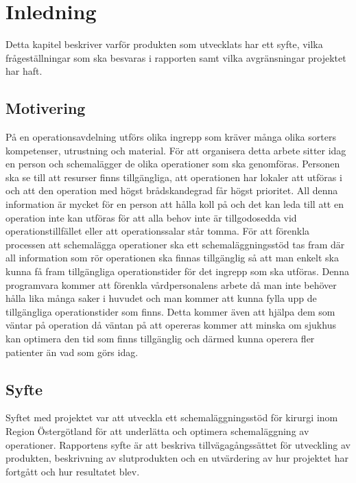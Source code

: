 \chapter{Inledning}
Detta kapitel beskriver varför produkten som utvecklats har ett syfte, vilka frågeställningar som ska besvaras i rapporten samt vilka avgränsningar projektet har haft.

\section{Motivering}
På en operationsavdelning utförs olika ingrepp som kräver många olika sorters kompetenser, utrustning och material. För att organisera detta arbete sitter idag en person och schemalägger de olika operationer som ska genomföras. Personen ska se till att resurser finns tillgängliga, att operationen har lokaler att utföras i och att den operation med högst brådskandegrad får högst prioritet. All denna information är mycket för en person att hålla koll på och det kan leda till att en operation inte kan utföras för att alla behov inte är tillgodosedda vid operationstillfället eller att operationssalar står tomma.
För att förenkla processen att schemalägga operationer ska ett schemaläggningsstöd tas fram där all information som rör operationen ska finnas tillgänglig så att man enkelt ska kunna få fram tillgängliga operationstider för det ingrepp som ska utföras. Denna programvara kommer att förenkla vårdpersonalens arbete då man inte behöver hålla lika många saker i huvudet och man kommer att kunna fylla upp de tillgängliga operationstider som finns. Detta kommer även att hjälpa dem som väntar på operation då väntan på att opereras kommer att minska om sjukhus kan optimera den tid som finns tillgänglig och därmed kunna operera fler patienter än vad som görs idag.

\section{Syfte}
Syftet med projektet var att utveckla ett schemaläggningsstöd för kirurgi inom Region Östergötland för att underlätta och optimera schemaläggning av operationer.
Rapportens syfte är att beskriva tillvägagångssättet för utveckling av produkten, beskrivning av slutprodukten och en utvärdering av hur projektet har fortgått och hur resultatet blev.

